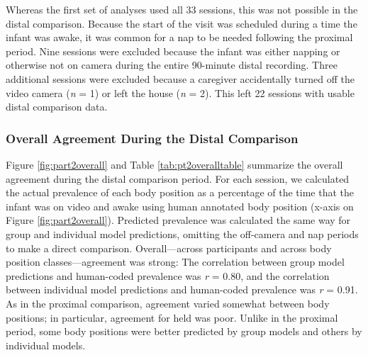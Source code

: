 \documentclass[
  man]{apa6}
\begin{document}
Whereas the first set of analyses used all 33 sessions, this was not possible in the distal comparison. Because the start of the visit was scheduled during a time the infant was awake, it was common for a nap to be needed following the proximal period. Nine sessions were excluded because the infant was either napping or otherwise not on camera during the entire 90-minute distal recording. Three additional sessions were excluded because a caregiver accidentally turned off the video camera (\emph{n} = 1) or left the house (\emph{n} = 2). This left 22 sessions with usable distal comparison data.

\hypertarget{overall-agreement-during-the-distal-comparison}{%
\subsubsection{Overall Agreement During the Distal Comparison}\label{overall-agreement-during-the-distal-comparison}}

Figure \ref{fig:part2overall} and Table \ref{tab:pt2overalltable} summarize the overall agreement during the distal comparison period. For each session, we calculated the actual prevalence of each body position as a percentage of the time that the infant was on video and awake using human annotated body position (x-axis on Figure \ref{fig:part2overall}). Predicted prevalence was calculated the same way for group and individual model predictions, omitting the off-camera and nap periods to make a direct comparison. Overall---across participants and across body position classes---agreement was strong: The correlation between group model predictions and human-coded prevalence was \emph{r} = 0.80, and the correlation between individual model predictions and human-coded prevalence was \emph{r} = 0.91. As in the proximal comparison, agreement varied somewhat between body positions; in particular, agreement for held was poor. Unlike in the proximal period, some body positions were better predicted by group models and others by individual models.
\end{document}

